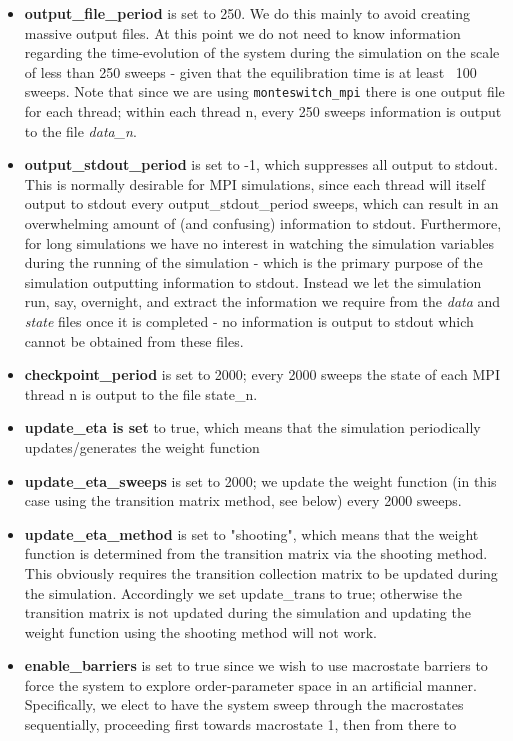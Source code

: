 \documentclass{report}
\begin{document}
\begin{itemize}
\item \textbf{output\_file\_period} is set to 250. We do this mainly to avoid creating massive output files. At this point we do not need to know 
  information regarding
  the time-evolution of the system during the simulation on the scale of less than 250 sweeps - given that the equilibration time is at least
  ~100 sweeps. Note that since we are using \texttt{monteswitch\_mpi} there is one output file for each thread; within each thread n, every 250 sweeps 
  information is output to the file \emph{data\_n}.
\item \textbf{output\_stdout\_period} is set to -1, which suppresses all output to stdout. This is normally desirable for MPI simulations, since each thread 
  will itself output to stdout every output\_stdout\_period sweeps, which can result in an overwhelming amount of (and confusing) information to stdout. 
  Furthermore, for long simulations we have no interest in watching the simulation variables during the running of the simulation - which is the primary
  purpose of the simulation outputting information to stdout. Instead we let the simulation run, say, overnight, and extract the information we require
  from the \emph{data} and \emph{state} files once it is completed - no information is output to stdout which cannot be obtained from these files.
\item \textbf{checkpoint\_period} is set to 2000; every 2000 sweeps the state of each MPI thread n is output to the file state\_n.
\item \textbf{update\_eta is set} to true, which means that the simulation periodically updates/generates the weight function
\item \textbf{update\_eta\_sweeps} is set to 2000; we update the weight function (in this case using the transition matrix method, see below) every 2000 
  sweeps.
\item \textbf{update\_eta\_method} is set to "shooting", which means that the weight function is determined from the transition matrix via the shooting 
  method.
  This obviously requires the transition collection matrix to be updated during the simulation. Accordingly we set update\_trans to true; otherwise
  the transition matrix is not updated during the simulation and updating the weight function using the shooting method will not work.
\item \textbf{enable\_barriers} is set to true since we wish to use macrostate barriers to force the system to explore order-parameter space in an 
  artificial manner.
  Specifically, we elect to have the system sweep through the macrostates sequentially, proceeding first towards macrostate 1, then from there to

\end{itemize}
\end{document}
